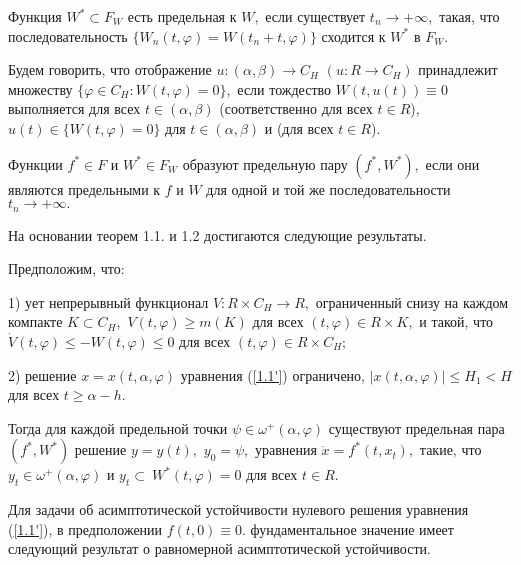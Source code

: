 \begin{definition}\label{d-3.1} Функция $W^*\subset F_W$ есть предельная к $W,$  если
	существует $t_n\to +\infty, $  такая,  что  последовательность $\{
	W_n(t,\varphi )=W(t_n+t,\varphi )\}$ сходится к $W^*$  в $F_{W}.$
\end{definition}

\begin{definition}\label{d-3.2} Будем говорить, что отображение
	$u : (\alpha ,\beta )\to C_{H}$ $(u : R\to C_{H})$ принадлежит
	множеству $\{ \varphi\in C_{H} : W(t,\varphi )=0 \},$ если
	тождество $W(t,u(t))\equiv 0$ выполняется для всех $t\in (\alpha
	,\beta )$ (соответственно для всех $t\in R$), $u(t)\in \{
	W(t,\varphi )=0\}$ для  $t\in (\alpha ,\beta )$ и (для всех $t\in
	R$).
\end{definition}

\begin{definition}\label{d-4.1}  Функции $f^* \in F$ и $W^*\in F_W$ образуют
	предельную пару $(f^*,W^*),$ если они являются предельными  к $f$ и
	$W$ для  одной  и  той  же  последовательности $t_n\to +\infty .$
\end{definition}

На основании теорем 1.1. и 1.2 достигаются следующие результаты.

\begin{theorem}\label{t-1.3} Предположим, что:
	
	1) 
	ует непрерывный функционал $V : R \times C_H\to R,$  ограниченный
	снизу на каждом компакте $K\subset C_H,$ $V(t,\varphi )\ge m(K)$
	для всех $(t,\varphi )\in R \times K,$ и такой, что $\dot
	V(t,\varphi )\le -W(t,\varphi )\le 0$  для  всех $(t,\varphi )\in R
	\times C_H;$
	
	2) решение $x=x(t,\alpha ,\varphi )$ уравнения (\ref{1.1'})  ограничено,
	$|x(t,\alpha ,\varphi )|\le H_1<H$
	для всех $t\ge\alpha -h.$
	
	Тогда для каждой  предельной
	точки $\psi\in\omega ^+(\alpha ,\varphi )$  существуют  предельная
	пара  $(f^*, W^*)$ решение $y=y(t),$ $y_0=\psi, $ уравнения $\dot x=f^*(t,x_t),$  такие,  что
	$ y_t\in \omega ^+(\alpha ,\varphi )$ и
	$y_t\subset\ { W^*(t,\varphi )=0}$
		для всех  $t\in R.$
	\end{theorem}
	
	Для задачи об асимптотической устойчивости нулевого
	решения уравнения (\ref{1.1'}), в предположении $f(t,0)\equiv 0.$ фундаментальное значение имеет следующий  результат   о
	равномерной асимптотической устойчивости.
	

